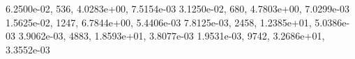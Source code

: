 6.2500e-02,   536, 4.0283e+00, 7.5154e-03 
3.1250e-02,   680, 4.7803e+00, 7.0299e-03 
1.5625e-02,  1247, 6.7844e+00, 5.4406e-03 
7.8125e-03,  2458, 1.2385e+01, 5.0386e-03 
3.9062e-03,  4883, 1.8593e+01, 3.8077e-03 
1.9531e-03,  9742, 3.2686e+01, 3.3552e-03 

